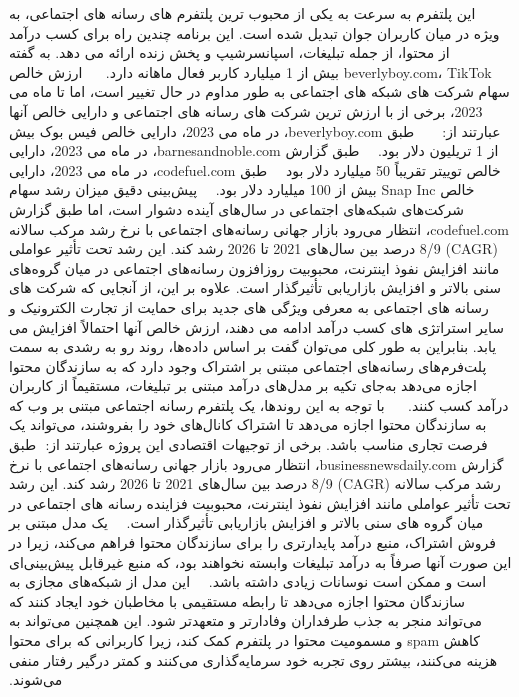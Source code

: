 ‫
‫ 
‫ 
‫این پلتفرم به سرعت به یکی از محبوب ترین پلتفرم های رسانه های اجتماعی، به ویژه در میان کاربران جوان تبدیل شده است. این برنامه چندین راه برای کسب درآمد از محتوا، از جمله تبلیغات، اسپانسرشیپ و پخش زنده ارائه می دهد. به گفته beverlyboy.com، TikTok بیش از 1 میلیارد کاربر فعال ماهانه دارد.
‫
‫
‫
‫
‫ارزش خالص سهام شرکت های شبکه های اجتماعی به طور مداوم در حال تغییر است، اما تا ماه می 2023، برخی از با ارزش ترین شرکت های رسانه های اجتماعی و دارایی خالص آنها عبارتند از:
‫
‫
‫
‫ 	
‫ طبق beverlyboy.com، در ماه می 2023، دارایی خالص فیس بوک بیش از 1 تریلیون دلار بود.
‫
‫ 	
‫ طبق گزارش barnesandnoble.com، در ماه می 2023، دارایی خالص توییتر تقریباً 50 میلیارد دلار بود
‫
‫
‫
‫طبق codefuel.com، در ماه می 2023، دارایی خالص Snap Inc بیش از 100 میلیارد دلار بود.
‫
‫
‫
‫پیش‌بینی دقیق میزان رشد سهام شرکت‌های شبکه‌های اجتماعی در سال‌های آینده دشوار است، اما طبق گزارش codefuel.com، انتظار می‌رود بازار جهانی رسانه‌های اجتماعی با نرخ رشد مرکب سالانه (CAGR) 8/9 درصد بین سال‌های 2021 تا 2026 رشد کند. این رشد تحت تأثیر عواملی مانند افزایش نفوذ اینترنت، محبوبیت روزافزون رسانه‌های اجتماعی در میان گروه‌های سنی بالاتر و افزایش بازاریابی تأثیرگذار است. علاوه بر این، از آنجایی که شرکت های رسانه های اجتماعی به معرفی ویژگی های جدید برای حمایت از تجارت الکترونیک و سایر استراتژی های کسب درآمد ادامه می دهند، ارزش خالص آنها احتمالاً افزایش می یابد. بنابراین به طور کلی می‌توان گفت بر اساس داده‌ها، روند رو به رشدی به سمت پلت‌فرم‌های رسانه‌های اجتماعی مبتنی بر اشتراک وجود دارد که به سازندگان محتوا اجازه می‌دهد به‌جای تکیه بر مدل‌های درآمد مبتنی بر تبلیغات، مستقیماً از کاربران درآمد کسب کنند. 
‫
‫
‫
‫
‫با توجه به این روندها، یک پلتفرم رسانه اجتماعی مبتنی بر وب که به سازندگان محتوا اجازه می‌دهد تا اشتراک کانال‌های خود را بفروشند، می‌تواند یک فرصت تجاری مناسب باشد. برخی از توجیهات اقتصادی این پروژه عبارتند از:
‫
‫
‫
‫
‫ 	
‫ طبق گزارش businessnewsdaily.com، انتظار می‌رود بازار جهانی رسانه‌های اجتماعی با نرخ رشد مرکب سالانه (CAGR) 8/9 درصد بین سال‌های 2021 تا 2026 رشد کند. این رشد تحت تأثیر عواملی مانند افزایش نفوذ اینترنت، محبوبیت فزاینده رسانه های اجتماعی در میان گروه های سنی بالاتر و افزایش بازاریابی تأثیرگذار است.
‫
‫	
‫ یک مدل مبتنی بر فروش اشتراک، منبع درآمد پایدارتری را برای سازندگان محتوا فراهم می‌کند، زیرا در این صورت آنها صرفاً به درآمد تبلیغات وابسته نخواهند بود، که منبع غیرقابل پیش‌بینی‌ای است و ممکن است نوسانات زیادی داشته باشد.
‫
‫ 	
‫ این مدل از شبکه‌های مجازی به سازندگان محتوا اجازه می‌دهد تا رابطه مستقیمی با مخاطبان خود ایجاد کنند که می‌تواند منجر به جذب طرفداران وفادارتر و متعهدتر شود. این همچنین می‌تواند به کاهش spam و مسمومیت محتوا در پلتفرم کمک کند، زیرا کاربرانی که برای محتوا هزینه می‌کنند، بیشتر روی تجربه خود سرمایه‌گذاری می‌کنند و کمتر درگیر رفتار منفی می‌شوند.
